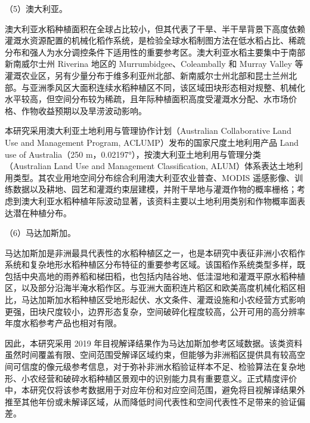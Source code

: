 \noindent （5）澳大利亚。

澳大利亚水稻种植面积在全球占比较小，但其代表了干旱、半干旱背景下高度依赖灌溉水资源配置的机械化稻作系统，是检验全球水稻制图方法在低水稻占比、稀疏分布和强人为水分调控条件下适用性的重要参考区。澳大利亚水稻主要集中于南部新南威尔士州 Riverina 地区的 Murrumbidgee、Coleambally 和 Murray Valley 等灌溉农业区，另有少量分布于维多利亚州北部、新南威尔士州北部和昆士兰州北部。与亚洲季风区大面积连续水稻种植区不同，该区域田块形态相对规整、机械化水平较高，但空间分布较为稀疏，且年际种植面积高度受灌溉水分配、水市场价格、作物收益预期以及旱涝波动影响。


本研究采用澳大利亚土地利用与管理协作计划（Australian Collaborative Land Use and Management Program, ACLUMP）发布的国家尺度土地利用产品 Land use of Australia（250 m，0.02197°），按澳大利亚土地利用与管理分类（Australian Land Use and Management Classification, ALUM）体系表达土地利用类型。其农业用地空间分布综合利用澳大利亚农业普查、MODIS 遥感影像、训练数据以及耕地、园艺和灌溉约束层建模，并附干旱地与灌溉作物的概率栅格；考虑到澳大利亚水稻种植年际波动显著，该资料主要以土地利用类别和作物概率面表达潜在种植分布。

\noindent （6）马达加斯加。

马达加斯加是非洲最具代表性的水稻种植区之一，也是本研究中表征非洲小农稻作系统和复杂地形水稻种植区分布特征的重要参考区域。该国稻作系统类型多样，既包括中央高地的雨养稻和梯田稻，也包括内陆谷地、低洼湿地和灌溉平原水稻种植区，以及部分沿海半淹水稻作区。与亚洲大面积连片稻区和欧美高度机械化稻区相比，马达加斯加水稻种植区受地形起伏、水文条件、灌溉设施和小农经营方式影响更强，田块尺度较小，边界形态复杂，空间破碎化程度较高，公开可用的高分辨率年度水稻参考产品也相对有限。

因此，本研究采用 2019 年目视解译结果作为马达加斯加参考区域数据。该类资料虽然时间覆盖有限、空间范围受解译区域约束，但能够为非洲稻区提供具有较高空间可信度的像元级参考信息，对于弥补非洲水稻验证样本不足、检验算法在复杂地形、小农经营和破碎水稻种植区景观中的识别能力具有重要意义。正式精度评价中，本研究仅将该参考数据用于对应年份和对应空间范围，避免将目视解译结果外推至其他年份或未解译区域，从而降低时间代表性和空间代表性不足带来的验证偏差。

